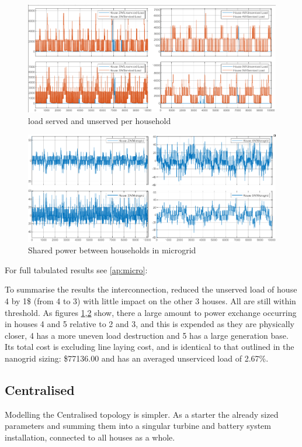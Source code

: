 \documentclass[journal]{IEEEtran}
\begin{document}
        \begin{figure}[h!]
                \centering
                \includegraphics[width=0.7\linewidth]{fig/distrib_load.png}
                \caption{load served and unserved per household}
                \label{fig:distrib_load}
        \end{figure} 

        \begin{figure}[h!]
                \centering
                \includegraphics[width=0.7\linewidth]{fig/distrib_micro.png}
                \caption{Shared power between households in microgrid}
                \label{fig:distrib_micro}
        \end{figure} 

        For full tabulated results see \ref{ap:micro}:
        
        To summarise the results the interconnection, reduced the unserved load of house 4 by 1\$ (from 4 to 3) with little impact on the other 3 houses. All are still within threshold. 
        As figures \ref{fig:distrib_load},\ref{fig:distrib_micro} show, there a large amount to power exchange occurring in houses 4 and 5 relative to 2 and 3, and this is expended as they are physically closer, 4 has a more uneven load destruction and 5 has a large generation base. 
        Its total cost is excluding line laying cost, and is identical to that outlined in the nanogrid sizing: \$77136.00 and has an averaged unserviced load of 2.67\%. 

        \subsection{Centralised}
        Modelling the Centralised topology is simpler. As a starter the already sized parameters and summing them into a singular turbine and battery system installation, connected to all houses as a whole. 
\end{document}

